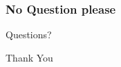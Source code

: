 \documentclass[
    10pt,
    aspectratio=169,
    xcolor={dvipsnames},
]{beamer}
\begin{document}
\begin{frame}
    \frametitle{No Question please}
    \begin{center}
        {\LARGE Questions?}
    \end{center}
\end{frame}

\begin{frame}
    \begin{center}
        {\LARGE Thank You}
    \end{center}
\end{frame}
\end{document}
